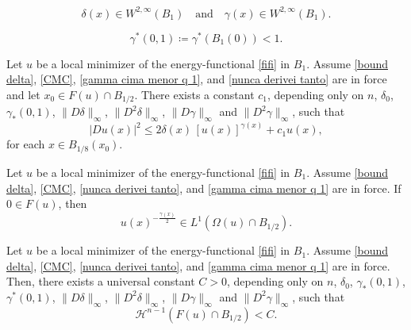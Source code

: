 \documentclass[10pt,a4paper]{amsart}
\begin{document}
\begin{equation}\label{nunca derivei tanto}
    \delta(x) \in W^{2,\infty}(B_1) \quad \text{and} \quad \gamma(x) \in W^{2,\infty}(B_1).
\end{equation}

\begin{equation}\label{gamma cima menor q 1}
        \gamma^\ast(0,1) \coloneqq \gamma^\ast(B_1(0)) < 1.
\end{equation}

\begin{lemma}\label{slightly dif pt grad est}
Let $u$ be a local minimizer of the energy-functional \eqref{fifi} in $B_1$. Assume \eqref{bound delta}, \eqref{CMC}, \eqref{gamma cima menor q 1}, and \eqref{nunca derivei tanto} are in force and let $x_0 \in F(u) \cap B_{1/2}$. There exists a constant $c_1$, depending only on $n$, $\delta_0$, $\gamma_\ast (0,1)$, $\|D\delta\|_\infty$, $\|D^2\delta\|_\infty$, $\|D\gamma\|_\infty$ and $\|D^2\gamma\|_\infty$, such that
$$
    |Du (x)|^2 \leq 2\delta(x)\,[u(x)]^{\gamma(x)} + c_1u(x),
$$
for each $x \in B_{1/8} (x_0)$.
\end{lemma}

\begin{lemma}\label{integrability of negative power of u}
    Let $u$ be a local minimizer of the energy-functional \eqref{fifi} in $B_1$. Assume \eqref{bound delta}, \eqref{CMC}, \eqref{nunca derivei tanto}, and \eqref{gamma cima menor q 1} are in force. If $0 \in F(u)$, then
    $$
        u(x)^{-\frac{\gamma(x)}{2}} \in L^1 (\Omega(u) \cap B_{1/2}).
    $$
\end{lemma}

\begin{theorem}
Let $u$ be a local minimizer of the energy-functional \eqref{fifi} in $B_1$. Assume \eqref{bound delta}, \eqref{CMC}, \eqref{nunca derivei tanto}, and \eqref{gamma cima menor q 1} are in force. Then, there exists a universal constant $C>0$,
depending only on $n$, $\delta_0$, $\gamma_\ast (0,1)$, $\gamma^\ast (0,1)$, $\|D\delta\|_\infty$, $\|D^2 \delta\|_{\infty}$, $\|D\gamma\|_\infty$ and $\|D^2 \gamma\|_{\infty}$, such that
$$
\mathcal{H}^{n-1}(F(u) \cap B_{1/2}) < C.
$$
\end{theorem}
\end{document}
